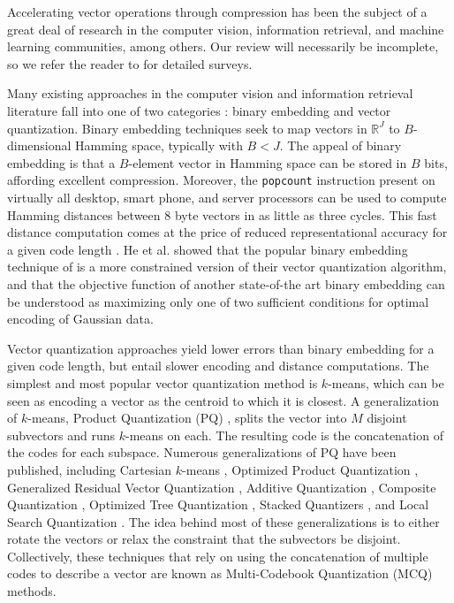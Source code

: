 
Accelerating vector operations through compression has been the subject of a great deal of research in the computer vision, information retrieval, and machine learning communities, among others. Our review will necessarily be incomplete, so we refer the reader to \cite{learningToHashSurvey, hashingSimilaritySurvey} for detailed surveys.

Many existing approaches in the computer vision and information retrieval literature fall into one of two categories \cite{hashingSimilaritySurvey}: binary embedding and vector quantization. Binary embedding techniques seek to map vectors in $\mathbb{R}^J$ to $B$-dimensional Hamming space, typically with $B < J$. The appeal of binary embedding is that a $B$-element vector in Hamming space can be stored in $B$ bits, affording excellent compression. Moreover, the \texttt{popcount} instruction present on virtually all desktop, smart phone, and server processors can be used to compute Hamming distances between 8 byte vectors in as little as three cycles. This fast distance computation comes at the price of reduced representational accuracy for a given code length \cite{opq,hashingSimilaritySurvey}. He et al. \cite{opq} showed that the popular binary embedding technique of \cite{ITQ} is a more constrained version of their vector quantization algorithm, and that the objective function of another state-of-the art binary embedding \cite{isohash} can be understood as maximizing only one of two sufficient conditions for optimal encoding of Gaussian data.

Vector quantization approaches yield lower errors than binary embedding for a given code length, but entail slower encoding and distance computations. The simplest and most popular vector quantization method is $k$-means, which can be seen as encoding a vector as the centroid to which it is closest. A generalization of $k$-means, Product Quantization (PQ) \cite{pq}, splits the vector into $M$ disjoint subvectors and runs $k$-means on each. The resulting code is the concatenation of the codes for each subspace. Numerous generalizations of PQ have been published, including Cartesian $k$-means \cite{cartesianKmeans}, Optimized Product Quantization \cite{opq},  Generalized Residual Vector Quantization \cite{grvq}, Additive Quantization \cite{aq}, Composite Quantization \cite{cq}, Optimized Tree Quantization \cite{otq}, Stacked Quantizers \cite{stackedQuantizers}, and Local Search Quantization \cite{lsq}. The idea behind most of these generalizations is to either rotate the vectors or relax the constraint that the subvectors be disjoint. Collectively, these techniques that rely on using the concatenation of multiple codes to describe a vector are known as Multi-Codebook Quantization (MCQ) methods. %

